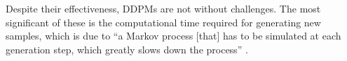 \begin{comment}
[
In the reverse process, the neural network can be trained to predict one of three possibilities: the mean of the noise at each time step, the original image itself, or the noise of the image \citep{hoDDPMs}. The second approach is not as advantageous as the ``estimating small perturbations is easier than explicitly describing the entire distribution with a single, non-analytically normalizable potential function'' \citep{sohlDDPM}. Focusing on the prediction of image noise is preferable because it allows a simple subtraction of the noise from the image, resulting in a less noisy version and thus also allowing an iterative generation of an image from the noise.
]
\end{comment}

Despite their effectiveness, DDPMs are not without challenges. The most significant of these is the computational time required for generating new samples, which is due to ``a Markov process [that] has to be simulated at each generation step, which greatly slows down the process'' \citep{martinez2023understanding}.